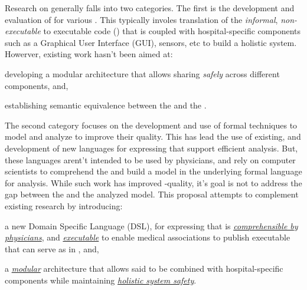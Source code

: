 Research on \CGSs{} generally falls into two categories. The first
is the development and evaluation of \CGSs{} for various \BPGs{}. This typically
involes translation of the \emph{informal}, \emph{non-executable} \BPG{} to executable code (\BPGLogic)
that is coupled with hospital-specific components such as a Graphical User
Interface (GUI), sensors, etc to build a holistic system.
Howerver, existing work hasn't been aimed at:
\begin{enumerate*}[label=(\alph*)]
  \item developing a modular architecture that allows sharing \BPGLogic{}
    \emph{safely} across different components, and,
  \item establishing semantic equivalence between the \BPGLogic{} and the
    \BPG{}.
\end{enumerate*}
The second category focuses on the development
and use of formal techniques to model and analyze \BPGs{}
to improve their quality. This has lead
the use of existing, and development of new languages
for expressing \BPGs{} that support efficient analysis. But, these
languages arent't intended to be used by physicians, and
rely on computer scientists to comprehend the \BPG{} and build a
model in the underlying formal language for analysis.
While such work has improved \BPG-quality, it's goal is not to address the gap between the \BPG{}
and the analyzed model.
This proposal attempts to complement existing research
by introducing:
\begin{enumerate*}[label=(\roman*)]
  \item a new Domain Specific Language (DSL),
    for expressing \BPGs{} that is \emph{\underline{comprehensible by physicians}}, and
    \emph{\underline{executable}}
    to enable medical associations to publish executable \BPGs{} that can serve as
    \BPGLogic{} in \CGSs{}, and,
 \item a \emph{\underline{modular}} architecture that allows said
   \BPGs{} to be combined with hospital-specific components while maintaining \emph{\underline{holistic system safety}}.
\end{enumerate*}

